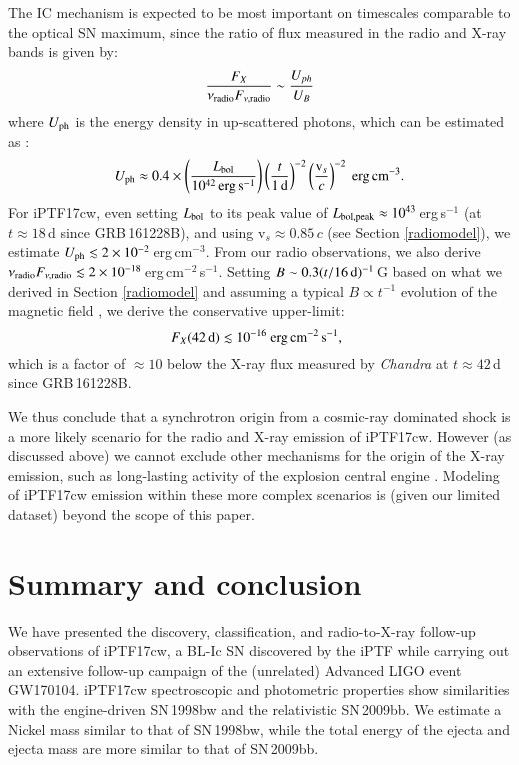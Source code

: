 \documentclass[twocolumn]{emulateapj}
\begin{document}
The IC mechanism is expected to be most important on timescales comparable to the optical SN maximum, since the ratio of flux measured in the radio and X-ray bands is given by:
\begin{equation}
\frac{F_X}{\nu_{\rm radio} F_{\nu, \rm radio}}\sim \frac{U_{ph}}{U_B}
\end{equation}
where $U_{\rm ph}$ is the energy density in up-scattered photons, which can be estimated as \citep{Bjornsson2004,Soderberg2006}:
\begin{equation}
U_{\rm ph}\approx 0.4 \times \left(\frac{L_{\rm bol}}{10^{42}\,{\rm erg\,s}^{-1}}\right)\left(\frac{t}{1\,\rm d}\right)^{-2} \left(\frac{{\rm v}_s}{c}\right)^{-2}~{\rm erg\,cm^{-3}}.
\end{equation}
For iPTF17cw, even setting $L_{\rm bol}$ to its peak value of $L_{\rm bol,peak}\approx 10^{43}$\,erg\,s$^{-1}$ (at $t\approx 18$\,d since GRB\,161228B), and using v$_{s}\approx 0.85\,c$ (see Section \ref{radiomodel}), we estimate $U_{\rm ph}\lesssim 2\times 10^{-2}$\,erg\,cm$^{-3}$. From our radio observations, we also derive $\nu_{\rm radio} F_{\nu, \rm radio} \lesssim 2\times 10^{-18}$\,erg\,cm$^{-2}$\,s$^{-1}$. Setting $B\sim 0.3 (t/16\,{\rm d})^{-1}$\,G based on what we derived in Section \ref{radiomodel} and assuming a typical $B\propto t^{-1}$ evolution of the magnetic field \citep{Chevalier1998}, we derive the conservative upper-limit:
\begin{equation}
F_X (42\,{\rm d})\lesssim  10^{-16}~{\rm erg\,cm^{-2}\,s^{-1}},~~
\end{equation}
which is a factor of $\approx 10$ below the X-ray flux measured by \textit{Chandra} at $t\approx 42$\,d since GRB\,161228B.

We thus conclude that a synchrotron origin from a cosmic-ray dominated shock is a more likely scenario for the radio and X-ray emission of iPTF17cw. However (as discussed above) we cannot exclude other mechanisms for the origin of the X-ray emission, such as long-lasting
activity of the explosion central engine \citep[e.g., a black hole plus torus system, or a magnetar progenitor; ][]{Margutti2013}. Modeling of iPTF17cw emission within these more complex scenarios is (given our limited dataset) beyond the scope of this paper.
\section{Summary and conclusion}
\label{conclusion}
We have presented the discovery, classification, and radio-to-X-ray follow-up observations
of iPTF17cw, a BL-Ic SN discovered by the iPTF while carrying out an extensive follow-up campaign of the (unrelated) Advanced LIGO event  GW170104. iPTF17cw spectroscopic and photometric properties show similarities with the engine-driven SN\,1998bw and the relativistic SN\,2009bb. We estimate a Nickel mass similar to that of SN\,1998bw, while the total energy of the ejecta and ejecta mass are more similar to that of SN\,2009bb.
\end{document}

